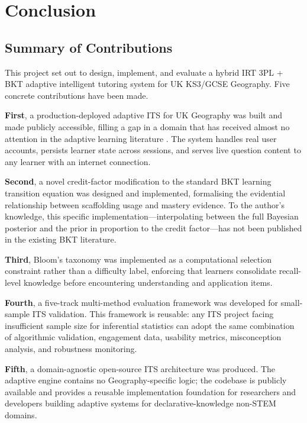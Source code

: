 \chapter{Conclusion}
\label{ch:conclusion}

\section{Summary of Contributions}
\label{sec:conc_contributions}

This project set out to design, implement, and evaluate a hybrid IRT 3PL +
BKT adaptive intelligent tutoring system for UK KS3/GCSE Geography. Five
concrete contributions have been made.

\textbf{First}, a production-deployed adaptive ITS for UK Geography was
built and made publicly accessible, filling a gap in a domain that has received
almost no attention in the adaptive learning literature \parencite{bednarz2013}.
The system handles real user accounts, persists learner state across sessions,
and serves live question content to any learner with an internet connection.

\textbf{Second}, a novel credit-factor modification to the standard BKT
learning transition equation was designed and implemented, formalising the
evidential relationship between scaffolding usage and mastery evidence. To the
author's knowledge, this specific implementation---interpolating between the
full Bayesian posterior and the prior in proportion to the credit
factor---has not been published in the existing BKT literature.

\textbf{Third}, Bloom's taxonomy was implemented as a computational selection
constraint rather than a difficulty label, enforcing that learners consolidate
recall-level knowledge before encountering understanding and application items.

\textbf{Fourth}, a five-track multi-method evaluation framework was developed
for small-sample ITS validation. This framework is reusable: any ITS project
facing insufficient sample size for inferential statistics can adopt the same
combination of algorithmic validation, engagement data, usability metrics,
misconception analysis, and robustness monitoring.

\textbf{Fifth}, a domain-agnostic open-source ITS architecture was produced.
The adaptive engine contains no Geography-specific logic; the codebase is
publicly available and provides a reusable implementation foundation for
researchers and developers building adaptive systems for declarative-knowledge
non-STEM domains.


